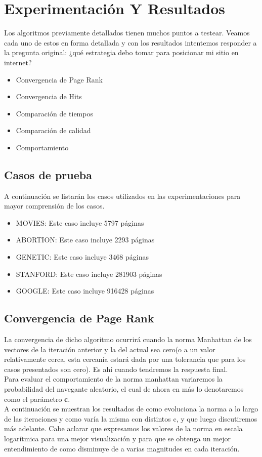 \section{Experimentación Y Resultados}

  Los algoritmos previamente detallados tienen muchos puntos a testear. Veamos cada uno de estos en forma detallada y con los resultados intentemos responder a la pregunta original: ¿qué estrategia debo tomar para posicionar mi sitio en internet?

  \begin{itemize}
    \item{Convergencia de Page Rank}
    \item{Convergencia de Hits}
    \item{Comparación de tiempos}
    \item{Comparación de calidad}
    \item{Comportamiento}
  \end{itemize}


\subsection{Casos de prueba}
   A continuación se listarán los casos utilizados en las experimentaciones para mayor comprensión de los casos.

	\begin{itemize}
		\item MOVIES: Este caso incluye 5797 páginas
		\item ABORTION: Este caso incluye 2293 páginas
		\item GENETIC: Este caso incluye 3468 páginas
		\item STANFORD: Este caso incluye 281903 páginas
		\item GOOGLE: Este caso incluye 916428 páginas
	\end{itemize}  

\subsection{Convergencia de Page Rank} 

La convergencia de dicho algoritmo ocurrirá cuando la norma Manhattan de los vectores de la iteración anterior y la del actual sea cero(o a un valor relativamente cerca, esta cercanía estará dada por una tolerancia que para los casos presentados son cero). Es ahí cuando tendremos la respuesta final.\\
Para evaluar el comportamiento de la norma manhattan variaremos la probabilidad del navegante aleatorio, el cual de ahora en más lo denotaremos como el parámetro \textbf{c}.\\
A continuación se muestran los resultados de como evoluciona la norma a lo largo de las iteraciones y como varía la misma con distintos c, y que luego discutiremos más adelante.
Cabe aclarar que expresamos los valores de la norma en escala logarítmica para una mejor visualización y para que se obtenga un mejor entendimiento de como disminuye de a varias magnitudes en cada iteración.


